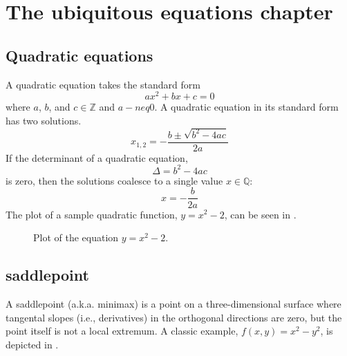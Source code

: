\chapter{The ubiquitous equations chapter}
\section{Quadratic equations}
A quadratic equation takes the standard form
\begin{equation}
    a x^2 + b x + c = 0
\end{equation}\label{eqn:quadratic}
where \( a \), \( b \), and \( c \in \mathbb{Z} \) and \( a -neq 0 \). %
%
A quadratic equation in its standard form has two solutions.
\begin{equation}
    x_{1,2} = - \frac{b \pm \sqrt{b^2 - 4 a c}}{2a}
\end{equation}\label{eqn:quadsolns}
%
If the determinant of a quadratic equation,
\begin{equation}
    \Delta = b^2 - 4 a c
\end{equation}
is zero, then the solutions coalesce to a single value \( x \in \mathbb{Q} \):
\begin{equation}
    x = - \frac{b}{2a}
\end{equation}
The plot of a sample quadratic function, \( y = x^2 - 2 \), can be seen in .

\begin{figure}[htbp!]
    \centering
    \caption{Plot of the equation \( y = x^2 - 2 \).}
    \label{fig:quadplot}
\end{figure}

\section{\Gls{saddlepoint}}
A \gls{saddlepoint} (a.k.a. \gls{minimax}) is a point on a three-dimensional surface where
tangental slopes (i.e., derivatives) in the orthogonal directions are zero, but the point
itself is not a local extremum. A classic example, \( f(x, y) = x^2 - y^2 \), is depicted in
.

